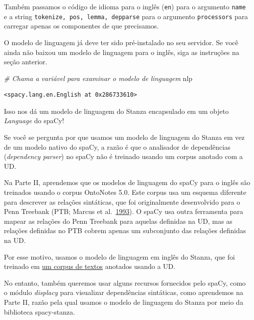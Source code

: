 \documentclass[
  brazilian,
]{article}
\newenvironment{Shaded}{}{}
\newcommand{\CommentTok}[1]{\textcolor[rgb]{0.38,0.63,0.69}{\textit{#1}}}
\newcommand{\NormalTok}[1]{#1}
\begin{document}
Também passamos o código de idioma para o inglês
(\texttt{\textquotesingle{}en\textquotesingle{}}) para o argumento
\texttt{name} e a string
\texttt{\textquotesingle{}tokenize,\ pos,\ lemma,\ depparse\textquotesingle{}}
para o argumento \texttt{processors} para carregar apenas os componentes
de que precisamos.

O modelo de linguagem já deve ter sido pré-instalado no seu servidor. Se
você ainda não baixou um modelo de linguagem para o inglês, siga as
instruções na seção anterior.

\begin{Shaded}
\begin{Highlighting}[]
\CommentTok{\# Chama a variável para examinar o modelo de linguagem}
\NormalTok{nlp}
\end{Highlighting}
\end{Shaded}

\begin{verbatim}
<spacy.lang.en.English at 0x286733610>
\end{verbatim}

Isso nos dá um modelo de linguagem do Stanza encapsulado em um objeto
\emph{Language} do spaCy!

Se você se pergunta por que usamos um modelo de linguagem do Stanza em
vez de um modelo nativo do spaCy, a razão é que o analisador de
dependências (\emph{dependency parser}) no spaCy não é treinado usando
um corpus anotado com a UD.

Na Parte II, aprendemos que os modelos de linguagem do spaCy para o
inglês são treinados usando o corpus OntoNotes 5.0. Este corpus usa um
esquema diferente para descrever as relações sintáticas, que foi
originalmente desenvolvido para o Penn Treebank (PTB; Marcus et
al.~\href{https://aclanthology.org/J93-2004/}{1993}). O spaCy usa outra
ferramenta para mapear as relações do Penn Treebank para aquelas
definidas na UD, mas as relações definidas no PTB cobrem apenas um
subconjunto das relações definidas na UD.

Por esse motivo, usamos o modelo de linguagem em inglês do Stanza, que
foi treinado em
\href{https://github.com/UniversalDependencies/UD_English-EWT}{um corpus
de textos} anotados usando a UD.

No entanto, também queremos usar alguns recursos fornecidos pelo spaCy,
como o módulo \emph{displacy} para visualizar dependências sintáticas,
como aprendemos na Parte II, razão pela qual usamos o modelo de
linguagem do Stanza por meio da biblioteca spacy-stanza.
\end{document}
